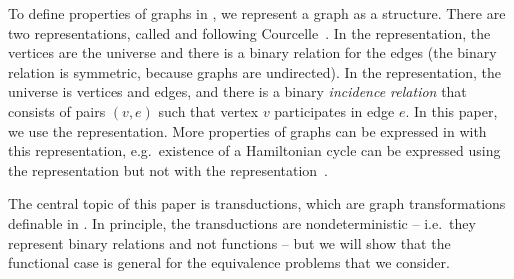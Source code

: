      
      To define properties of graphs in \mso, we represent a graph as a structure. There are two representations, called  \msoone and \msotwo following 
 Courcelle~\cite[Definition 1.7]{courcelleVI}. In the \msoone representation, the vertices are the universe and there is a binary relation for the edges (the binary relation is symmetric, because graphs are undirected). In the \msotwo representation, the universe is vertices and edges, and there is a binary  \emph{incidence relation} that consists of pairs $(v,e)$ such that vertex $v$ participates in edge $e$. 
In this paper, we use the \msotwo representation. More properties of graphs can be expressed in \mso with this representation, e.g.~existence of a Hamiltonian cycle can be expressed using the \msotwo representation but not with the \msoone representation~\cite[p.~118]{courcelleVI}.

  The central topic of this paper is \mso transductions, which are graph transformations definable in \mso. In principle, the transductions are nondeterministic -- i.e.~they represent binary relations and not functions -- but we will show that the functional case is general for the equivalence problems that we consider.


